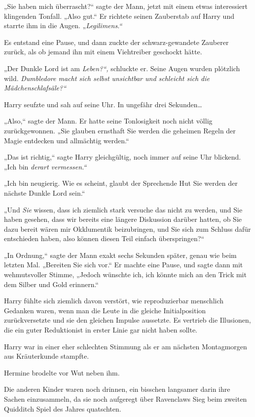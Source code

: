 {„Sie haben mich überrascht?“ sagte der Mann, jetzt mit einem etwas interessiert klingenden Tonfall. „Also gut.“ Er richtete seinen Zauberstab auf Harry und starrte ihm in die Augen. „\emph{Legilimens.“}

Es entstand eine Pause, und dann zuckte der schwarz-gewandete Zauberer zurück, als ob jemand ihn mit einem Viehtreiber geschockt hätte.

„Der Dunkle Lord ist am \emph{Leben?“,} schluckte er. Seine Augen wurden plötzlich wild. \emph{Dumbledore macht sich selbst unsichtbar und schleicht sich die Mädchenschlafsäle?“}

Harry seufzte und sah auf seine Uhr. In ungefähr drei Sekunden…

„Also,“ sagte der Mann. Er hatte seine Tonlosigkeit noch nicht völlig zurückgewonnen. „Sie glauben ernsthaft Sie werden die geheimen Regeln der Magie entdecken und allmächtig werden.“

„Das ist richtig,“ sagte Harry gleichgültig, noch immer auf seine Uhr blickend. „Ich bin \emph{derart vermessen.“}

„Ich bin neugierig. Wie es scheint, glaubt der Sprechende Hut Sie werden der nächste Dunkle Lord sein.“

„Und \emph{Sie} wissen, dass ich ziemlich stark versuche das nicht zu werden, und Sie haben gesehen, dass wir bereits eine längere Diskussion darüber hatten, ob Sie dazu bereit wären mir Okklumentik beizubringen, und Sie sich zum Schluss dafür entschieden haben, also können diesen Teil einfach überspringen?“

„In Ordnung,“ sagte der Mann exakt sechs Sekunden später, genau wie beim letzten Mal. „Bereiten Sie sich vor.“ Er machte eine Pause, und sagte dann mit wehmutsvoller Stimme, „Jedoch wünschte ich, ich könnte mich an den Trick mit dem Silber und Gold erinnern.“

Harry fühlte sich ziemlich davon verstört, wie reproduzierbar menschlich Gedanken waren, wenn man die Leute in die gleiche Initialposition zurückversetzte und sie den gleichen Impulse aussetzte. Es vertrieb die Illusionen, die ein guter Reduktionist in erster Linie gar nicht haben sollte.

Harry war in einer eher schlechten Stimmung als er am nächsten Montagmorgen aus Kräuterkunde stampfte.

Hermine brodelte vor Wut neben ihm.

Die anderen Kinder waren noch drinnen, ein bisschen langsamer darin ihre Sachen einzusammeln, da sie noch aufgeregt über Ravenclaws Sieg beim zweiten Quidditch Spiel des Jahres quatschten.

}

